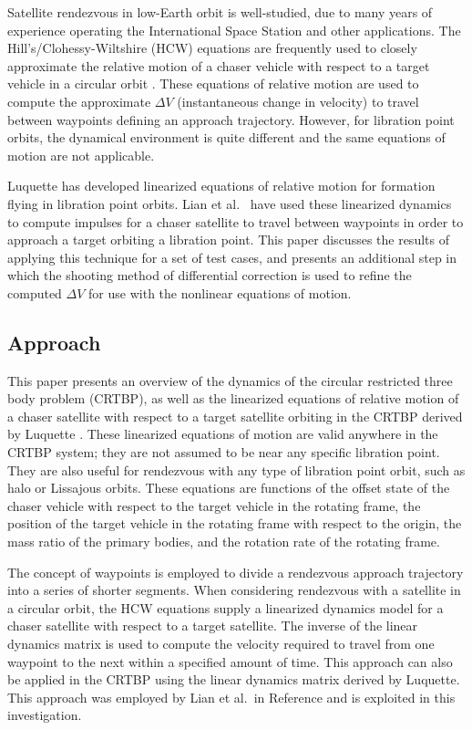 \documentclass[a4paper]{article}
\begin{document}
Satellite rendezvous in low-Earth orbit is well-studied, due to many years of experience operating the International Space Station and other applications.  The Hill's/Clohessy-Wiltshire (HCW) equations are frequently used to closely approximate the relative motion of a chaser vehicle with respect to a target vehicle in a circular orbit \cite{clohessy1960}.  These equations of relative motion are used to compute the approximate \(\Delta V\) (instantaneous change in velocity) to travel between waypoints defining an approach trajectory.  However, for libration point orbits, the dynamical environment is quite different and the same equations of motion are not applicable.

Luquette \cite{luquette2004} has developed linearized equations of relative motion for formation flying in libration point orbits.  Lian et al.~\cite{lian2011} have used these linearized dynamics to compute impulses for a chaser satellite to travel between waypoints in order to approach a target orbiting a libration point.  This paper discusses the results of applying this technique for a set of test cases, and presents an additional step in which the shooting method of differential correction is used to refine the computed \(\Delta V\) for use with the nonlinear equations of motion.

\subsection*{Approach}

This paper presents an overview of the dynamics of the circular restricted three body problem (CRTBP), as well as the linearized equations of relative motion of a chaser satellite with respect to a target satellite orbiting in the CRTBP derived by Luquette \cite{luquette2004}. These linearized equations of motion are valid anywhere in the CRTBP system; they are not assumed to be near any specific libration point. They are also useful for rendezvous with any type of libration point orbit, such as halo or Lissajous orbits. These equations are functions of the offset state of the chaser vehicle with respect to the target vehicle in the rotating frame, the position of the target vehicle in the rotating frame with respect to the origin, the mass ratio of the primary bodies, and the rotation rate of the rotating frame.

The concept of waypoints is employed to divide a rendezvous approach trajectory into a series of shorter segments.  When considering rendezvous with a satellite in a circular orbit, the HCW equations supply a linearized dynamics model for a chaser satellite with respect to a target satellite.  The inverse of the linear dynamics matrix is used to compute the velocity required to travel from one waypoint to the next within a specified amount of time.  This approach can also be applied in the CRTBP using the linear dynamics matrix derived by Luquette.  This approach was employed by Lian et al.~in Reference \cite{lian2011} and is exploited in this investigation. 
\end{document}
